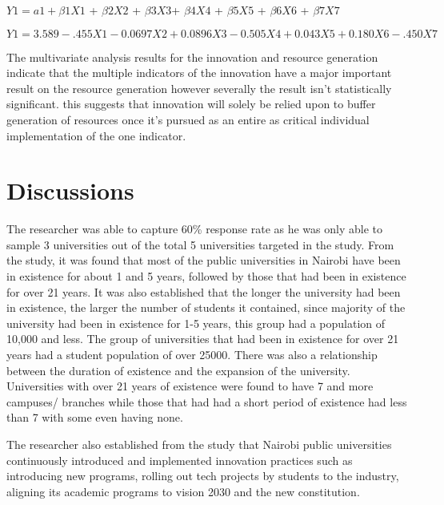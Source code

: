 $Y1 = a1+ \beta1X1$ + $\beta2X2$ + $\beta3X3$+ $\beta4X4$ + $\beta5X5$ + $\beta6X6$ + $\beta7X7$

$Y1= 3.589 -.455X1 -0.0697X2 + 0.0896X3 -0.505X4 +0.043X5 + 0.180X6 -.450X7$

The multivariate analysis results for the innovation and resource generation indicate that the multiple indicators of the innovation have a major important result on the resource generation however severally the result isn't statistically significant. this suggests that innovation will solely be relied upon to buffer generation of resources once it's pursued as an entire as critical individual implementation of the one indicator.

\section{\textbf{Discussions}}
The researcher was able to capture 60\% response rate as he was only able to sample 3 universities out of the total 5 universities targeted in the study. From the study, it was found that most of the public universities in Nairobi have been in existence for about 1 and 5 years, followed by those that had been in existence for over 21 years. It was also established that the longer the university had been in existence, the larger the number of students it contained, since majority of the university had been in existence for 1-5 years, this group had a population of 10,000 and less. The group of universities that had been in existence for over 21 years had a student population of over 25000. There was also a relationship between the duration of existence and the expansion of the university. Universities with over 21 years of existence were found to have 7 and more campuses/ branches while those that had had a short period of existence had less than 7 with some even having none.

The researcher also established from the study that Nairobi public universities continuously introduced and implemented innovation practices such as introducing new programs, rolling out tech projects by students to the industry, aligning its academic programs to vision 2030 and the new constitution.

